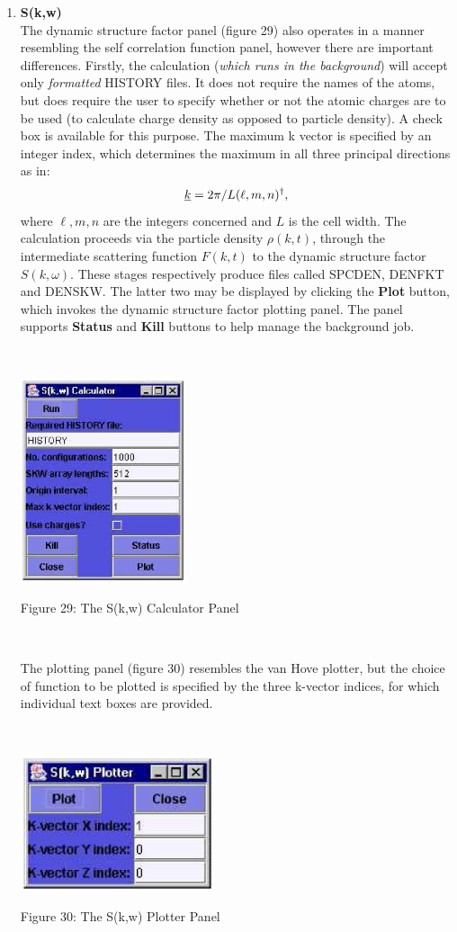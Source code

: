\begin{enumerate}
\item {\bf S(k,w)} \\
  The dynamic structure factor panel (figure 29) also operates in a manner
  resembling the self correlation function panel, however there are important
  differences. Firstly, the calculation ({\em which runs in the background})
  will accept only {\em formatted} HISTORY files. It does not require the
  names of the atoms, but does require the user to specify whether or not the
  atomic charges are to be used (to calculate charge density as opposed to
  particle density). A check box is available for this purpose. The maximum k
  vector is specified by an integer index, which determines the maximum in all
  three principal directions as in: \[\mbox{$\underline{k}$}=2\pi/L(\ell,m,n)^{\dagger},\]
  where $\ell,m,n$ are the integers concerned and $L$ is the cell width. The
  calculation proceeds via the particle density $\rho(k,t)$, through the
  intermediate scattering function $F(k,t)$ to the dynamic structure factor
  $S(k,\omega)$.  These stages respectively produce files called SPCDEN,
  DENFKT and DENSKW. The latter two may be displayed by clicking the {\bf
    Plot} button, which invokes the dynamic structure factor plotting panel.
  The panel supports {\bf Status} and {\bf Kill} buttons to help manage the
  background job.

~

\begin{center}
\centerline{\includegraphics[height=6cm]{skw.ps}}
\centerline{Figure 29: The S(k,w) Calculator Panel}
\end{center}

~

The plotting panel (figure 30) resembles the van Hove
plotter, but the choice of function to be plotted is specified
by the three k-vector indices, for which individual text boxes are
provided. 

~

\begin{center}
\centerline{\includegraphics[height=4.0cm]{skwplot.ps}}
\centerline{Figure 30: The S(k,w) Plotter Panel}
\end{center}


\end{enumerate}

